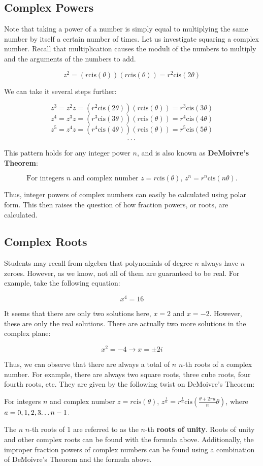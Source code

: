 \documentclass[11pt]{article}
\begin{document}
\subsection{Complex Powers}

Note that taking a power of a number is simply equal to multiplying the same number by itself a certain number of times. Let us investigate squaring a complex number. Recall that multiplication causes the moduli of the numbers to multiply and the arguments of the numbers to add.

\[ z^2 = (r\text{cis}(\theta))(r\text{cis}(\theta)) = r^2\text{cis}(2\theta) \]

We can take it several steps further:

\[ z^3 = z^2z = (r^2\text{cis}(2\theta))(r\text{cis}(\theta)) = r^3\text{cis}(3\theta) \]
\[ z^4 = z^3z = (r^3\text{cis}(3\theta))(r\text{cis}(\theta)) = r^4\text{cis}(4\theta) \]
\[ z^5 = z^4z = (r^4\text{cis}(4\theta))(r\text{cis}(\theta)) = r^5\text{cis}(5\theta) \]
\[ \text{\dots} \]

This pattern holds for any integer power $n$, and is also known as \textbf{DeMoivre's Theorem}:

\[ \text{For integers } n \text{ and complex number }z = r\text{cis}(\theta)\text{, } z^n = r^n\text{cis}(n\theta).\]

Thus, integer powers of complex numbers can easily be calculated using polar form. This then raises the question of how fraction powers, or roots, are calculated.

\subsection{Complex Roots}
Students may recall from algebra that polynomials of degree $n$ always have $n$ zeroes. However, as we know, not all of them are guaranteed to be real. For example, take the following equation:

\[ x^4 = 16 \]

It seems that there are only two solutions here, $x=2$ and $x=-2$. However, these are only the real solutions. There are actually two more solutions in the complex plane:

\[ x^2 = -4 \to x = \pm 2i\]

Thus, we can observe that there are always a total of $n$ $n$-th roots of a complex number. For example, there are always two square roots, three cube roots, four fourth roots, etc. They are given by the following twist on DeMoivre's Theorem:\\

\begin{center}
For integers $n$ and complex number $z = r\text{cis}(\theta)$, $z^{\frac{1}{n}} = r^{\frac{1}{n}}\text{cis}(\frac{\theta+2\pi a}{n}\theta)$, where $a = 0, 1, 2, 3 \text{\dots} n-1$.
\end{center} 
\vspace{0.5 cm}

The $n$ $n$-th roots of 1 are referred to as the $n$-th \textbf{roots of unity}. Roots of unity and other complex roots can be found with the formula above. Additionally, the improper fraction powers of complex numbers can be found using a combination of DeMoivre's Theorem and the formula above.
\end{document}
